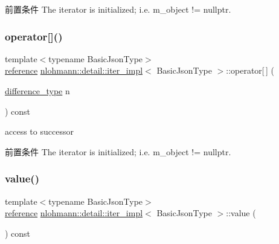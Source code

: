 \begin{DoxyPrecond}{前置条件}
The iterator is initialized; i.\+e. {\ttfamily m\+\_\+object != nullptr}. 
\end{DoxyPrecond}
\mbox{\label{classnlohmann_1_1detail_1_1iter__impl_ac0b9276f1102ed4b9cd3f5f56287e3ce}} 
\subsubsection{\texorpdfstring{operator[]()}{operator[]()}}
{\footnotesize\ttfamily template$<$typename Basic\+Json\+Type$>$ \\
\mbox{\hyperlink{classnlohmann_1_1detail_1_1iter__impl_a5be8001be099c6b82310f4d387b953ce}{reference}} \mbox{\hyperlink{classnlohmann_1_1detail_1_1iter__impl}{nlohmann\+::detail\+::iter\+\_\+impl}}$<$ Basic\+Json\+Type $>$\+::operator\mbox{[}$\,$\mbox{]} (\begin{DoxyParamCaption}\item[{\mbox{\hyperlink{classnlohmann_1_1detail_1_1iter__impl_a2f7ea9f7022850809c60fc3263775840}{difference\+\_\+type}}}]{n }\end{DoxyParamCaption}) const\hspace{0.3cm}{\ttfamily [inline]}}



access to successor 

\begin{DoxyPrecond}{前置条件}
The iterator is initialized; i.\+e. {\ttfamily m\+\_\+object != nullptr}. 
\end{DoxyPrecond}
\mbox{\label{classnlohmann_1_1detail_1_1iter__impl_ab447c50354c6611fa2ae0100ac17845c}} 
\subsubsection{\texorpdfstring{value()}{value()}}
{\footnotesize\ttfamily template$<$typename Basic\+Json\+Type$>$ \\
\mbox{\hyperlink{classnlohmann_1_1detail_1_1iter__impl_a5be8001be099c6b82310f4d387b953ce}{reference}} \mbox{\hyperlink{classnlohmann_1_1detail_1_1iter__impl}{nlohmann\+::detail\+::iter\+\_\+impl}}$<$ Basic\+Json\+Type $>$\+::value (\begin{DoxyParamCaption}{ }\end{DoxyParamCaption}) const\hspace{0.3cm}{\ttfamily [inline]}}



